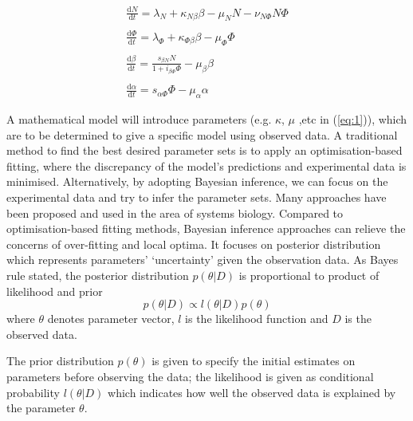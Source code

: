 \documentclass{article}
\begin{document}
\begin{equation} \label{eq:1}
\begin{array}{l}
\frac{\mathrm{d} N}{\mathrm{d} t}=\lambda_N+\kappa_{N\beta}\beta-\mu_NN-\nu_{N\Phi}N\Phi\\\\
\frac{\mathrm{d} \Phi}{\mathrm{d} t}=\lambda_\Phi+\kappa_{\Phi\beta}\beta-\mu_\Phi\Phi\\\\
\frac{\mathrm{d} \beta}{\mathrm{d} t}=\frac{s_{\beta N}N}{1+i_{\beta\Phi}\Phi}-\mu_\beta\beta\\\\
\frac{\mathrm{d} \alpha}{\mathrm{d} t}=s_{\alpha\Phi}\Phi-\mu_\alpha\alpha
\end{array}
\end{equation}

A mathematical model will introduce parameters (e.g. $\kappa$, $\mu$ ,etc in (\ref{eq:1})), which are to be determined to 
give a specific model using observed data. A traditional method to find the best desired parameter sets 
is to apply an optimisation-based fitting, where the discrepancy of the model’s 
predictions and experimental data is minimised. Alternatively, by adopting Bayesian 
inference, we can focus on the experimental data and try to infer the parameter sets. 
Many approaches have been proposed and used in the area of systems biology\cite{ref:Stumpf}. Compared 
to optimisation-based fitting methods, Bayesian inference approaches can relieve the 
concerns of over-fitting and local optima. It focuses on posterior distribution which 
represents parameters’ ‘uncertainty’ given the observation data. As Bayes rule 
stated, the posterior distribution $p(\theta|D)$ is proportional to product of likelihood and 
prior
\begin{equation} \label{eq:2}
p(\theta|D)\propto l(\theta|D)p(\theta)
\end{equation}
where $\theta$ denotes parameter vector, $l$ is the likelihood function and $D$ is the observed data.

The prior distribution $p(\theta)$ is given to specify the initial estimates on 
parameters before observing the data; the likelihood is given as conditional 
probability $l(\theta|D)$ which indicates how well the observed data is explained by 
the parameter $\theta$.

\end{document}
